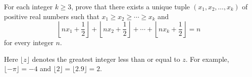 For each integer $k\geq 3$, prove that there exists a unique tuple $(x_1,x_2,\ldots,x_k)$ of positive real numbers such that $x_1\geq x_2\geq\cdots\geq x_k$ and
\[
\left\lfloor nx_1+\frac12\right\rfloor+
\left\lfloor nx_2+\frac12\right\rfloor+\cdots+
\left\lfloor nx_k+\frac12\right\rfloor=n
\]
for every integer $n$.

Here $\lfloor z\rfloor$ denotes the greatest integer less than or equal to $z$. For example, $\lfloor-\pi\rfloor=-4$ and $\lfloor2\rfloor=\lfloor2.9\rfloor=2$.
